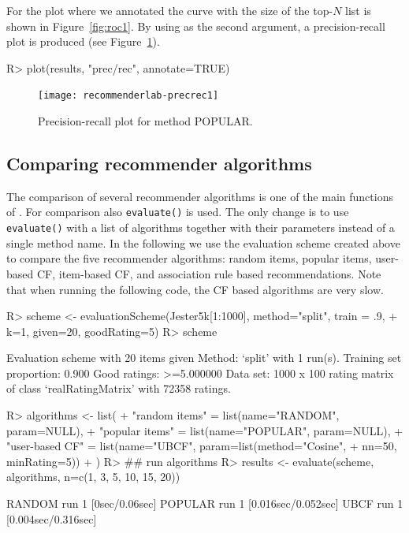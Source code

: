 \documentclass[nojss]{jss}
\newcommand{\func}[1]{\mbox{\texttt{#1()}}}
\begin{document}
For the plot where we annotated the curve with the size of the top-$N$ list
is shown in Figure~\ref{fig:roc1}.
By using  as the second argument, a precision-recall plot
is produced (see Figure~\ref{fig:precrec1}).

\begin{Schunk}
\begin{Sinput}
R> plot(results, "prec/rec", annotate=TRUE)
\end{Sinput}
\end{Schunk}
\begin{figure}
\centerline{\texttt{[image: recommenderlab-precrec1]}}
\caption{Precision-recall plot for method POPULAR.}
\label{fig:precrec1}
\end{figure}

\subsection{Comparing recommender algorithms}

The comparison of
several recommender algorithms is one of the main functions of 
. For comparison also \func{evaluate} is used.
The only change is to use \func{evaluate} with
a list of algorithms together with their parameters instead of 
a single method name. In the following we use the
evaluation scheme created above to compare the five 
recommender algorithms: random items, popular items, 
user-based CF, item-based CF, and association rule based recommendations.
Note that when running the following code, the CF based algorithms
are very slow.



\begin{Schunk}
\begin{Sinput}
R> scheme <- evaluationScheme(Jester5k[1:1000], method="split", train = .9, 
+     k=1, given=20, goodRating=5)
R> scheme
\end{Sinput}
\begin{Soutput}
Evaluation scheme with 20 items given
Method: ‘split’ with 1 run(s).
Training set proportion: 0.900
Good ratings: >=5.000000
Data set: 1000 x 100 rating matrix of class ‘realRatingMatrix’ with 72358 ratings.
\end{Soutput}
\begin{Sinput}
R> algorithms <- list(
+         "random items" = list(name="RANDOM", param=NULL),
+         "popular items" = list(name="POPULAR", param=NULL),
+         "user-based CF" = list(name="UBCF", param=list(method="Cosine", 
+ 		nn=50, minRating=5))
+         )
R> ## run algorithms
R> results <- evaluate(scheme, algorithms, n=c(1, 3, 5, 10, 15, 20))
\end{Sinput}
\begin{Soutput}
RANDOM run 
	 1  [0sec/0.06sec] 
POPULAR run 
	 1  [0.016sec/0.052sec] 
UBCF run 
	 1  [0.004sec/0.316sec] 
\end{Soutput}
\end{Schunk}
\end{document}
